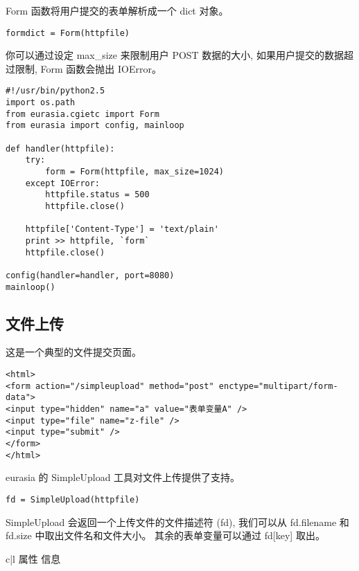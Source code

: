 \documentclass{manual}
\begin{document}
Form 函数将用户提交的表单解析成一个 dict 对象。

\begin{verbatim}
formdict = Form(httpfile)
\end{verbatim}

你可以通过设定 max_size 来限制用户 POST 数据的大小, 如果用户提交的数据超过限制, Form 函数会抛出 IOError。

\begin{verbatim}
#!/usr/bin/python2.5
import os.path
from eurasia.cgietc import Form
from eurasia import config, mainloop

def handler(httpfile):
	try:
		form = Form(httpfile, max_size=1024)
	except IOError:
		httpfile.status = 500
		httpfile.close()

	httpfile['Content-Type'] = 'text/plain'
	print >> httpfile, `form`
	httpfile.close()

config(handler=handler, port=8080)
mainloop()
\end{verbatim}


\subsection{文件上传}

这是一个典型的文件提交页面。

\begin{verbatim}
<html>
<form action="/simpleupload" method="post" enctype="multipart/form-data">
<input type="hidden" name="a" value="表单变量A" />
<input type="file" name="z-file" />
<input type="submit" />
</form>
</html>
\end{verbatim}

eurasia 的 SimpleUpload 工具对文件上传提供了支持。

\begin{verbatim}
fd = SimpleUpload(httpfile)
\end{verbatim}

SimpleUpload 会返回一个上传文件的文件描述符 (fd), 我们可以从 fd.filename 和 fd.size 中取出文件名和文件大小。
其余的表单变量可以通过 fd[key] 取出。

\begin{tableii}{c|l}{}{ 属性 }{ 信息 }
\end{tableii}
\end{document}

